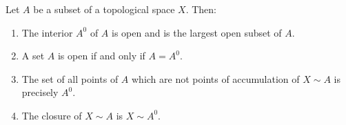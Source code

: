 Let $A$ be a subset of a topological space $X$. Then:
\begin{enumerate}
\item The interior $A^{0}$ of $A$ is open and is the largest open subset of $A$.
\item A set $A$ is open if and only if $A = A^{0}$.
\item The set of all points of $A$ which are not points of accumulation of $X \sim A$ is precisely $A^{0}$.
\item The closure of $X \sim A$ is $X \sim A^{0}$.
\end{enumerate}
